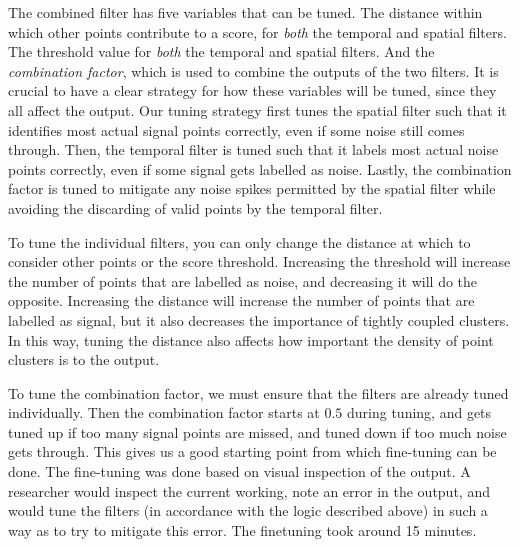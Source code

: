 The combined filter has five variables that can be tuned.
The distance within which other points contribute to a score, for \textit{both} the temporal and spatial filters.
The threshold value for \textit{both} the temporal and spatial filters.
And the \textit{combination factor}, which is used to combine the outputs of the two filters.
It is crucial to have a clear strategy for how these variables will be tuned, since they all affect the output.
Our tuning strategy first tunes the spatial filter such that it identifies most actual signal points correctly, even if some noise still comes through.
Then, the temporal filter is tuned such that it labels most actual noise points correctly, even if some signal gets labelled as noise.
Lastly, the combination factor is tuned to mitigate any noise spikes permitted by the spatial filter while avoiding the discarding of valid points by the temporal filter.

To tune the individual filters, you can only change the distance at which to consider other points or the score threshold.
Increasing the threshold will increase the number of points that are labelled as noise, and decreasing it will do the opposite.
Increasing the distance will increase the number of points that are labelled as signal, but it also decreases the importance of tightly coupled clusters.
In this way, tuning the distance also affects how important the density of point clusters is to the output.

To tune the combination factor, we must ensure that the filters are already tuned individually.
Then the combination factor starts at $0.5$ during tuning, and gets tuned up if too many signal points are missed, and tuned down if too much noise gets through.
This gives us a good starting point from which fine-tuning can be done.
The fine-tuning was done based on visual inspection of the output.
A researcher would inspect the current working, note an error in the output, and would tune the filters (in accordance with the logic described above) in such a way as to try to mitigate this error.
The finetuning took around 15 minutes.







